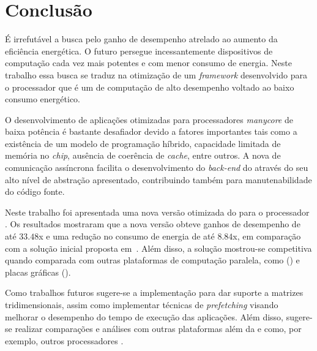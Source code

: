 %

\chapter{Conclusão}
\label{cap:conclusao}

É irrefutável a busca pelo ganho de desempenho atrelado ao aumento da eficiência energética. O futuro persegue incessantemente dispositivos de computação cada vez mais potentes e com menor consumo de energia. Neste trabalho essa busca se traduz na otimização de um \textit{framework} desenvolvido para o processador \mppa que é um \chip de computação de alto desempenho voltado ao baixo consumo energético. 

O desenvolvimento de aplicações otimizadas para processadores \textit{manycore} de baixa potência é bastante desafiador devido a fatores importantes tais como a existência de um modelo de programação híbrido, capacidade limitada de memória no \textit{chip}, ausência de coerência de \textit{cache}, entre outros. A nova \api de comunicação assíncrona facilita o desenvolvimento do \textit{back-end} do \fw através do seu alto nível de abstração apresentado, contribuindo também para manutenabilidade do código fonte.

Neste trabalho foi apresentada uma nova versão otimizada do \fw \pskel para o processador \mppa. Os resultados mostraram que a nova versão obteve ganhos de desempenho de até $33.48$x e uma redução no consumo de energia de até $8.84$x, em comparação com a solução inicial proposta em~\cite{Podesta:TCC}. Além disso, a solução mostrou-se competitiva quando comparada com outras plataformas de computação paralela, como \multicore (\cpu) e placas gráficas (\gpu). 

Como trabalhos futuros sugere-se a implementação para dar suporte a matrizes tridimensionais, assim como implementar técnicas de \textit{prefetching} visando melhorar o desempenho do tempo de execução das aplicações. Além disso, sugere-se realizar comparações e análises com outras plataformas além da \cpu e \gpu como, por exemplo, outros processadores \manycore.